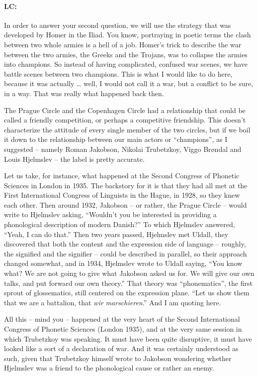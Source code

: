 \documentclass[output=paper]{langscibook}
\begin{document}
\paragraph*{LC:} In order to answer your second question, we will use the strategy that was developed by Homer in the Iliad. You know, portraying in poetic terms the clash between two whole armies is a hell of a job. Homer’s trick to describe the war between the two armies, the Greeks and the Trojans, was to collapse the armies into champions. So instead of having complicated, confused war scenes, we have battle scenes between two champions. This is what I would like to do here, because it was actually … well, I would not call it a war, but a conflict to be sure, in a way. That was really what happened back then.

The Prague Circle and the Copenhagen Circle had a relationship that could be called a friendly competition, or perhaps a competitive friendship. This doesn’t characterize the attitude of every single member of the two circles, but if we boil it down to the relationship between our main actors or “champions”, as I suggested – namely Roman Jakobson, Nikolai Trubetzkoy, Viggo Brøndal and Louis Hjelmslev – the label is pretty accurate. 

Let us take, for instance, what happened at the Second Congress of Phonetic Sciences in London in 1935. The backstory for it is that they had all met at the First International Congress of Linguists in the Hague, in 1928, so they knew each other. Then around 1932, Jakobson – or rather, the Prague Circle – would write to Hjelmslev asking, “Wouldn’t you be interested in providing a phonological description of modern Danish?” To which Hjelmslev answered, “Yeah, I can do that.” Then two years passed, Hjelmslev met Uldall, they discovered that both the content and the expression side of language – roughly, the signified and the signifier – could be described in parallel, so their approach changed somewhat, and in 1934, Hjelmslev wrote to Uldall saying, “You know what? We are not going to give what Jakobson asked us for. We will give our own talks, and put forward our own theory.” That theory was “phonematics”, the first sprout of glossematics, still centered on the expression plane. “Let us show them that we are a battalion, that \textit{wir marschieren}.” And I am quoting here. 

All this – mind you – happened at the very heart of the Second International Congress of Phonetic Sciences (London 1935), and at the very same session in which Trubetzkoy was speaking. It must have been quite disruptive, it must have looked like a sort of a declaration of war. And it was certainly understood as such, given that Trubetzkoy himself wrote to Jakobson wondering whether Hjelmslev was a friend to the phonological cause or rather an enemy.
\end{document}
